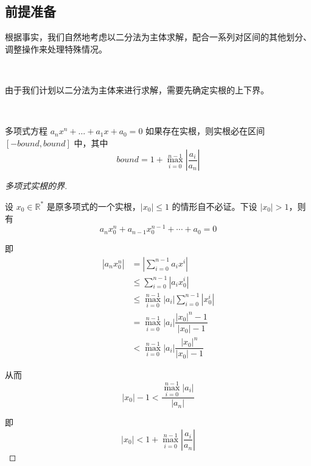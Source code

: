 \subsection{前提准备}

根据事实，我们自然地考虑以二分法为主体求解，配合一系列对区间的其他划分、调整操作来处理特殊情况。

\begin{problem}[对可能存在的实根作界的估计]~
	
	由于我们计划以二分法为主体来进行求解，需要先确定实根的上下界。
	
	
\end{problem}

\begin{theorem}[多项式实根的界]~
	
	多项式方程 $a_nx^n+\dots+a_1x+a_0 = 0$ 如果存在实根，则实根必在区间 $[-bound, bound]$ 中，其中
	$$
	bound = 1 + \max_{i = 0}^{n - 1} \left|\frac{a_i}{a_n}\right|
	$$
	
\end{theorem}

\begin{proof}[多项式实根的界]~
	
	设 $x_0 \in \mathbb{R}^*$ 是原多项式的一个实根，$|x_0| \le 1$ 的情形自不必证。下设 $|x_0| > 1$，则有
	$$
	a_nx_0^n + a_{n - 1}x_0^{n - 1} + \cdots + a_0 = 0
	$$
	
	即
	$$
	\begin{aligned}
	|a_nx_0^n| & = \left|\sum_{i = 0}^{n - 1} a_ix^i\right| \\
	& \le \sum_{i = 0}^{n - 1} |a_ix_0^i| \\
	& \le \max_{i = 0}^{n - 1} |a_i| \sum_{i = 0}^{n - 1}|x_0^i| \\
	& = \max_{i = 0}^{n - 1} |a_i| \dfrac{|x_0|^n - 1}{|x_0| - 1} \\
	& < \max_{i = 0}^{n - 1} |a_i| \dfrac{|x_0|^n}{|x_0| - 1}
	\end{aligned}
	$$
	
	从而
	$$
	|x_0| - 1 < \dfrac{\max_{i = 0}^{n - 1} |a_i|}{|a_n|}
	$$
	
	即
	$$
	|x_0| < 1 + \max_{i = 0}^{n - 1} \left|\frac{a_i}{a_n}\right|
	$$
	\qedhere
	
	
\end{proof}

